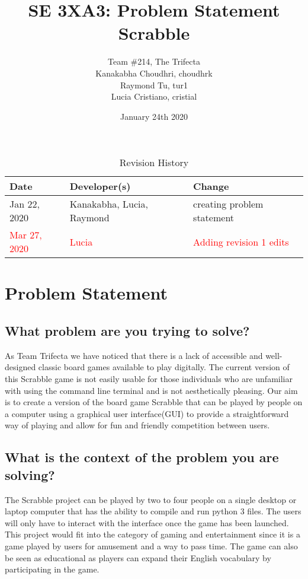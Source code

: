 \documentclass{article}
\title{SE 3XA3: Problem Statement\\ Scrabble}
\author{Team \#214, The Trifecta
		\\ Kanakabha Choudhri, choudhrk
		\\ Raymond Tu, tur1
		\\ Lucia Cristiano, cristial
}
\date{January 24th 2020}
\begin{document}
\begin{table}[hp]
\caption{Revision History} \label{TblRevisionHistory}
\begin{tabularx}{\textwidth}{llX}
\toprule
\textbf{Date} & \textbf{Developer(s)} & \textbf{Change}\\
\midrule
Jan 22, 2020 & Kanakabha, Lucia, Raymond & creating problem statement\\
\textcolor{red}{Mar 27, 2020} & \textcolor{red}{Lucia} & \textcolor{red}{Adding revision 1 edits}\\
\bottomrule
\end{tabularx}
\end{table}

\newpage

\maketitle

\section*{Problem Statement}
\subsection*{What problem are you trying to solve?}

As Team Trifecta we have noticed that there is a lack of accessible and well-designed classic board games available to play digitally. The current version of this Scrabble game is not easily usable for those individuals who are unfamiliar with using the command line terminal and is not aesthetically pleasing. Our aim is to create a version of the board game Scrabble that can be played by people on a computer using a graphical user interface(GUI) to provide a straightforward way of playing and allow for fun and friendly competition between users.\\

\subsection*{What is the context of the problem you are solving?}

The Scrabble project can be played by two to four people on a single desktop or laptop computer that has the ability to compile and run python 3 files. The users will only have to interact with the interface once the game has been launched. This project would fit into the category of gaming and entertainment since it is a game played by users for amusement and a way to pass time. The game can also be seen as educational as players can expand their English vocabulary by participating in the game. \\
\end{document}
